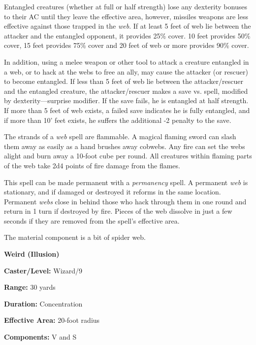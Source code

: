\begin{multicols}{2}
Entangled creatures (whether at full or half strength) lose any dexterity bonuses to their AC until they leave the effective area, however, missiles weapons are less effective against those trapped in the \textit{web}.  If at least 5 feet of web lie between the attacker and the entangled opponent, it provides 25\% cover.  10 feet provides 50\% cover, 15 feet provides 75\% cover and 20 feet of web or more provides 90\% cover.

In addition, using a melee weapon or other tool to attack a creature entangled in a web, or to hack at the webs to free an ally, may cause the attacker (or rescuer) to become entangled.  If less than 5 feet of web lie between the attacker/rescuer and the entangled creature, the attacker/rescuer makes a save vs. spell, modified by dexterity---surprise modifier.  If the save fails, he is entangled at half strength.  If more than 5 feet of web exists, a failed save indicates he is fully entangled, and if more than 10' feet exists, he suffers the additional -2 penalty to the save.

The strands of a \textit{web} spell are flammable. A magical flaming sword can slash them away as easily as a hand brushes away cobwebs. Any fire can set the webs alight and burn away a 10-foot cube per round.  All creatures within flaming parts of the web take 2d4 points of fire damage from the flames. 

This spell can be made permanent with a \textit{permanency} spell.  A permanent \textit{web} is stationary, and if damaged or destroyed it reforms in the same location.  Permanent \textit{webs} close in behind those who hack through them in one round and return in 1 turn if destroyed by fire.  Pieces of the web dissolve in just a few seconds if they are removed from the spell's effective area.

The material component is a bit of spider web.

\vspace{1em}

\noindent
\begin{minipage}{\columnwidth}

\noindent \textbf{Weird (Illusion)}

\noindent \textbf{Caster/Level:} Wizard/9

\noindent \textbf{Range:} 30 yards

\noindent \textbf{Duration:} Concentration

\noindent \textbf{Effective Area:} 20-foot radius

\noindent \textbf{Components:} V and S


\end{minipage}
\end{multicols}
